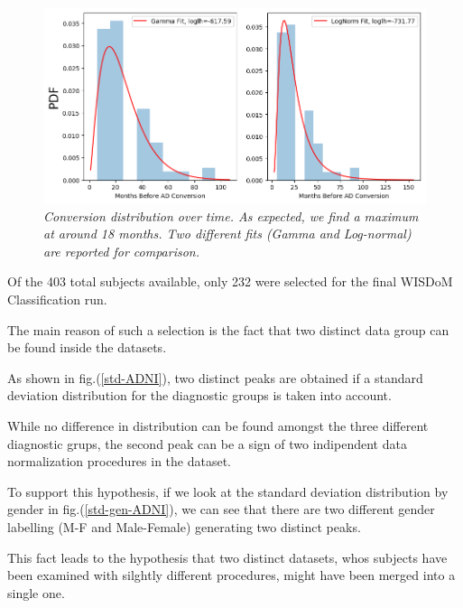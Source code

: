 \documentclass[12pt,openright,twoside,a4paper]{book}
\begin{document}
\begin{figure}[!h]
\centering
\includegraphics[scale=0.65]{conv-comp}
\caption{\textit{Conversion distribution over time. As expected, we find a maximum at around 18 months. Two different fits (Gamma and Log-normal) are reported for comparison.}}
\label{conv-comp}
\end{figure}

\vspace{5mm}

Of the 403 total subjects available, only 232 were selected for the final WISDoM Classification run.

The main reason of such a selection is the fact that two distinct data group can be found inside the datasets.

As shown in fig.(\ref{std-ADNI}), two distinct peaks are obtained if a standard deviation distribution for the diagnostic groups is taken into account.

While no difference in distribution can be found amongst the three different diagnostic grups, the second peak can be a sign of two indipendent data normalization procedures in the dataset.

To support this hypothesis, if we look at the standard deviation distribution by gender in fig.(\ref{std-gen-ADNI}), we can see that there are two different gender labelling (M-F and Male-Female) generating two distinct peaks. 

This fact leads to the hypothesis that two distinct datasets, whos subjects have been examined with silghtly different procedures, might have been merged into a single one.
\end{document}

